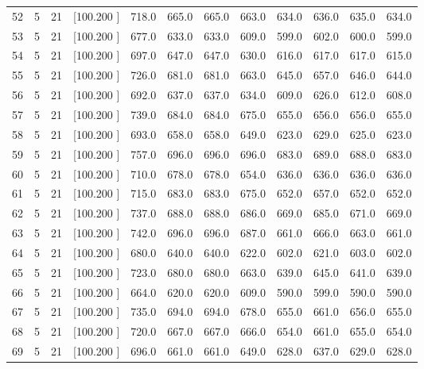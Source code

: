 \documentclass[12pt,a4paper]{article}
\begin{document}
\begin{center}
{\begin{tabular}{r r r r r r r r r r r r}
  52&  5& 21&[100.200   ]&   718.0&   665.0&   665.0&   663.0&   634.0&   636.0&   635.0&   634.0\\[-0.02in]
  53&  5& 21&[100.200   ]&   677.0&   633.0&   633.0&   609.0&   599.0&   602.0&   600.0&   599.0\\[-0.02in]
  54&  5& 21&[100.200   ]&   697.0&   647.0&   647.0&   630.0&   616.0&   617.0&   617.0&   615.0\\[-0.02in]
  55&  5& 21&[100.200   ]&   726.0&   681.0&   681.0&   663.0&   645.0&   657.0&   646.0&   644.0\\[-0.02in]
  56&  5& 21&[100.200   ]&   692.0&   637.0&   637.0&   634.0&   609.0&   626.0&   612.0&   608.0\\[-0.02in]
  57&  5& 21&[100.200   ]&   739.0&   684.0&   684.0&   675.0&   655.0&   656.0&   656.0&   655.0\\[-0.02in]
  58&  5& 21&[100.200   ]&   693.0&   658.0&   658.0&   649.0&   623.0&   629.0&   625.0&   623.0\\[-0.02in]
  59&  5& 21&[100.200   ]&   757.0&   696.0&   696.0&   696.0&   683.0&   689.0&   688.0&   683.0\\[-0.02in]
  60&  5& 21&[100.200   ]&   710.0&   678.0&   678.0&   654.0&   636.0&   636.0&   636.0&   636.0\\[-0.02in]
  61&  5& 21&[100.200   ]&   715.0&   683.0&   683.0&   675.0&   652.0&   657.0&   652.0&   652.0\\[-0.02in]
  62&  5& 21&[100.200   ]&   737.0&   688.0&   688.0&   686.0&   669.0&   685.0&   671.0&   669.0\\[-0.02in]
  63&  5& 21&[100.200   ]&   742.0&   696.0&   696.0&   687.0&   661.0&   666.0&   663.0&   661.0\\[-0.02in]
  64&  5& 21&[100.200   ]&   680.0&   640.0&   640.0&   622.0&   602.0&   621.0&   603.0&   602.0\\[-0.02in]
  65&  5& 21&[100.200   ]&   723.0&   680.0&   680.0&   663.0&   639.0&   645.0&   641.0&   639.0\\[-0.02in]
  66&  5& 21&[100.200   ]&   664.0&   620.0&   620.0&   609.0&   590.0&   599.0&   590.0&   590.0\\[-0.02in]
  67&  5& 21&[100.200   ]&   735.0&   694.0&   694.0&   678.0&   655.0&   661.0&   656.0&   655.0\\[-0.02in]
  68&  5& 21&[100.200   ]&   720.0&   667.0&   667.0&   666.0&   654.0&   661.0&   655.0&   654.0\\[-0.02in]
  69&  5& 21&[100.200   ]&   696.0&   661.0&   661.0&   649.0&   628.0&   637.0&   629.0&   628.0\\[-0.02in]

\end{tabular}}
\end{center}
\end{document}
